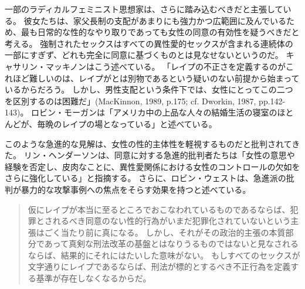\documentclass[paper=a4,book,openany]{jlreq}
\newcommand{\ig}[1]{}           %
\begin{document}
一部のラディカルフェミニスト思想家は、さらに踏み込むべきだと主張している。
彼女たちは、家父長制の支配があまりにも強力かつ広範囲に及んでいるため、最も日常的な性的なやり取りであっても女性の同意の有効性を疑うべきだと考える。
強制されたセックスはすべての異性愛的セックスが含まれる連続体の一部にすぎず、どれも完全に同意に基づくものとは見なせないというのだ。
キャサリン・マッキノン\ig{Catharine MacKinnon}はこう述べている。
「レイプの不正さを定義するのがこれほど難しいのは、レイプがとは別物であるという疑いのない前提から始まっているからだろう。
しかし、男性支配という条件下では、女性にとってこの二つを区別するのは困難だ」(MacKinnon, 1989, p.175; cf. Dworkin, 1987, pp.142-143)。
\nocite{mackinnon89:_towar_femin_theor_of_state}\nocite{dworkin87:_inter}
ロビン・モーガン\ig{Robin Morgan}は「アメリカ中の上品な人々の結婚生活の寝室のほとんどが、毎晩のレイプの場となっている」と述べている\citep[pp.136-137]{morgan80:_theor_and_pract}。

このような急進的な見解は、女性の性的主体性を軽視するものだと批判されてきた。
リン・ヘンダーソン\ig{Lynne Henderson}は、同意に対する急進的批判者たちは「女性の意思や経験を否定し、皮肉なことに、異性愛関係における女性のコントロールの欠如をさらに強化している」と指摘する\citep[p.56]{henderson93:_gettin_know}。
さらに、ロビン・ウェスト\ig{Robin West}は、急進派の批判が暴力的な攻撃事例への焦点をそらす効果を持つと述べている。

\begin{quote}
仮にレイプが本当に至るところでおこなわれているものであるならば、犯罪とされるべき同意のない性的行為がいまだ犯罪化されていないという主張はごく当たり前に真になる。
しかし、それがその政治的主張の本質部分であって真剣な刑法改革の基盤とはなりうるものではないと見なされるならば、結果的にそれにはたいした意味がない。
もしすべてのセックスが文字通りにレイプであるならば、刑法が標的とするべき不正行為を定義する基準が存在しなくなるからだ。\citep{west10:_sex_law_consen}
\end{quote}
\end{document}
